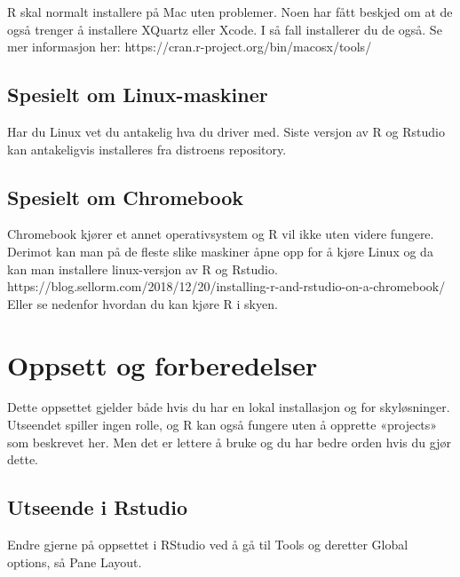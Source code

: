\documentclass[
  letterpaper,
  DIV=11,
  numbers=noendperiod]{scrreprt}
\theoremstyle{definition}
\theoremstyle{remark}
\begin{document}
R skal normalt installere på Mac uten problemer. Noen har fått beskjed
om at de også trenger å installere XQuartz eller Xcode. I så fall
installerer du de også. Se mer informasjon her:
https://cran.r-project.org/bin/macosx/tools/

\hypertarget{spesielt-om-linux-maskiner}{%
\subsection{Spesielt om
Linux-maskiner}\label{spesielt-om-linux-maskiner}}

Har du Linux vet du antakelig hva du driver med. Siste versjon av R og
Rstudio kan antakeligvis installeres fra distroens repository.

\hypertarget{spesielt-om-chromebook}{%
\subsection{Spesielt om Chromebook}\label{spesielt-om-chromebook}}

Chromebook kjører et annet operativsystem og R vil ikke uten videre
fungere. Derimot kan man på de fleste slike maskiner åpne opp for å
kjøre Linux og da kan man installere linux-versjon av R og Rstudio.
https://blog.sellorm.com/2018/12/20/installing-r-and-rstudio-on-a-chromebook/
Eller se nedenfor hvordan du kan kjøre R i skyen.

\hypertarget{oppsett-og-forberedelser}{%
\section{Oppsett og forberedelser}\label{oppsett-og-forberedelser}}

Dette oppsettet gjelder både hvis du har en lokal installasjon og for
skyløsninger. Utseendet spiller ingen rolle, og R kan også fungere uten
å opprette «projects» som beskrevet her. Men det er lettere å bruke og
du har bedre orden hvis du gjør dette.

\hypertarget{utseende-i-rstudio}{%
\subsection{Utseende i Rstudio}\label{utseende-i-rstudio}}

Endre gjerne på oppsettet i RStudio ved å gå til Tools og deretter
Global options, så Pane Layout.
\end{document}
